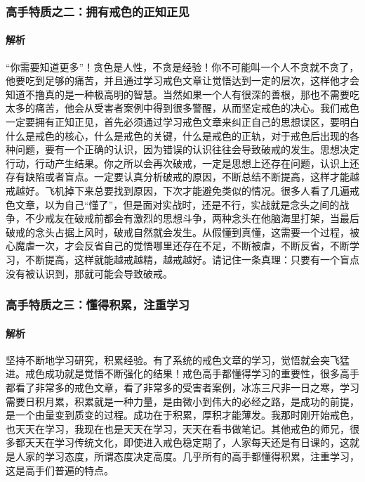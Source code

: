 \documentclass{ctexart}
\begin{document}
\subsubsection{高手特质之二：拥有戒色的正知正见}

\paragraph{解析} “你需要知道更多”！贪色是人性，不贪是经验！你不可能叫一个人不贪就不贪了，他要吃到足够的痛苦，并且通过学习戒色文章让觉悟达到一定的层次，这样他才会知道不撸真的是一种极高明的智慧。当然如果一个人有很深的善根，那也不需要吃太多的痛苦，他会从受害者案例中得到很多警醒，从而坚定戒色的决心。我们戒色一定要拥有正知正见，首先必须通过学习戒色文章来纠正自己的思想误区，要明白什么是戒色的核心，什么是戒色的关键，什么是戒色的正轨，对于戒色后出现的各种问题，要有一个正确的认识，因为错误的认识往往会导致破戒的发生。思想决定行动，行动产生结果。你之所以会再次破戒，一定是思想上还存在问题，认识上还存有缺陷或者盲点。一定要认真分析破戒的原因，不断总结不断提高，这样才能越戒越好。飞机掉下来总要找到原因，下次才能避免类似的情况。很多人看了几遍戒色文章，以为自己“懂了”，但是面对实战时，还是不行，实战就是念头之间的战争，不少戒友在破戒前都会有激烈的思想斗争，两种念头在他脑海里打架，当最后破戒的念头占据上风时，破戒自然就会发生。从假懂到真懂，这需要一个过程，被心魔虐一次，才会反省自己的觉悟哪里还存在不足，不断被虐，不断反省，不断学习，不断提高，这样就能越戒越精，越戒越好。请记住一条真理：只要有一个盲点没有被认识到，那就可能会导致破戒。

\subsubsection{高手特质之三：懂得积累，注重学习}

\paragraph{解析} 坚持不断地学习研究，积累经验。有了系统的戒色文章的学习，觉悟就会突飞猛进。戒色成功就是觉悟不断强化的结果！戒色高手都懂得学习的重要性，很多高手都看了非常多的戒色文章，看了非常多的受害者案例，冰冻三尺非一日之寒，学习需要日积月累，积累就是一种力量，是由微小到伟大的必经之路，是成功的前提，是一个由量变到质变的过程。成功在于积累，厚积才能薄发。我那时刚开始戒色，也天天在学习，我现在也是天天在学习，天天在看书做笔记。其他戒色的师兄，很多都天天在学习传统文化，即使进入戒色稳定期了，人家每天还是有日课的，这就是人家的学习态度，所谓态度决定高度。几乎所有的高手都懂得积累，注重学习，这是高手们普遍的特点。
\end{document}
